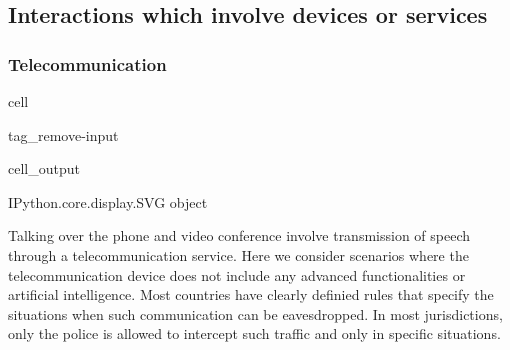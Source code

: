 \documentclass[letterpaper,10pt,english]{jupyterBook}
\begin{document}
\subsection{Interactions which involve devices or services}
\label{\detokenize{Security_and_privacy:interactions-which-involve-devices-or-services}}

\subsubsection{Telecommunication}
\label{\detokenize{Security_and_privacy:telecommunication}}
\begin{sphinxuseclass}{cell}
\begin{sphinxuseclass}{tag_remove-input}\begin{sphinxVerbatimOutput}

\begin{sphinxuseclass}{cell_output}
\begin{sphinxVerbatim}[commandchars=\\\{\}]
\PYGZlt{}IPython.core.display.SVG object\PYGZgt{}
\end{sphinxVerbatim}

\end{sphinxuseclass}\end{sphinxVerbatimOutput}

\end{sphinxuseclass}
\end{sphinxuseclass}
\sphinxAtStartPar
Talking over the phone and video conference involve transmission of speech through a telecommunication service. Here we consider scenarios where the telecommunication device does not include any advanced functionalities or artificial intelligence. Most countries have clearly definied rules that specify the situations when such communication can be eavesdropped. In most jurisdictions, only the police is allowed to intercept such traffic and only in specific situations.
\end{document}
